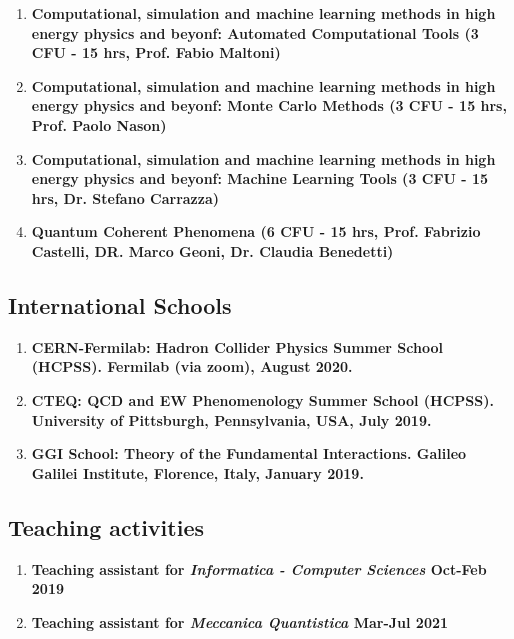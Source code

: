 \documentclass[12pt]{article}
\begin{document}
\begin{enumerate}{\leftmargin 15pt \itemsep 0pt \topsep 3pt}
	\item{\bf Computational, simulation and machine learning methods in high energy physics and beyonf: Automated Computational Tools (3 CFU - 15 hrs, Prof. Fabio Maltoni)}
	\item{\bf Computational, simulation and machine learning methods in high energy physics and beyonf: Monte Carlo Methods (3 CFU - 15 hrs, Prof. Paolo Nason)}
	\item{\bf Computational, simulation and machine learning methods in high energy physics and beyonf: Machine Learning Tools (3 CFU - 15 hrs, Dr. Stefano Carrazza)}
	\item{\bf Quantum Coherent Phenomena (6 CFU - 15 hrs, Prof. Fabrizio Castelli, DR. Marco Geoni, Dr. Claudia Benedetti)}
\end{enumerate}


\subsection{International Schools}

\begin{enumerate}{\leftmargin 15pt \itemsep 0pt \topsep 3pt}
	\item{\bf CERN-Fermilab: Hadron Collider Physics Summer School (HCPSS). Fermilab (via zoom), August 2020.}
	\item{\bf CTEQ: QCD and EW Phenomenology Summer School (HCPSS). University of Pittsburgh, Pennsylvania, USA, July 2019.}
	\item{\bf GGI School: Theory of the Fundamental Interactions. Galileo Galilei Institute, Florence, Italy, January 2019.}
\end{enumerate}

\subsection{Teaching activities}

\begin{enumerate}{\leftmargin 15pt \itemsep 0pt \topsep 3pt}
	\item{\bf Teaching assistant for \textit{Informatica - Computer Sciences} \hspace{1cm} Oct-Feb 2019}
	\item{\bf Teaching assistant for \textit{Meccanica Quantistica} \hspace{1cm} Mar-Jul 2021}
\end{enumerate}
\end{document}
